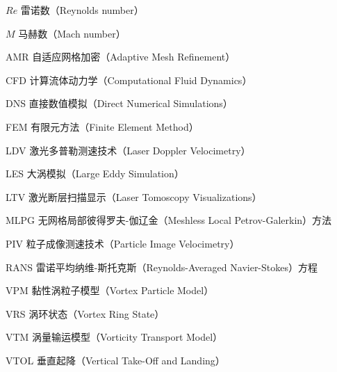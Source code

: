 \begin{denotation}
\item[$Re$] 雷诺数（Reynolds number）
\item[$M$] 马赫数（Mach number）
\item[AMR] 自适应网格加密（Adaptive Mesh Refinement）
\item[CFD] 计算流体动力学（Computational Fluid Dynamics）
\item[DNS] 直接数值模拟（Direct Numerical Simulations）
\item[FEM] 有限元方法（Finite Element Method）
\item[LDV] 激光多普勒测速技术（Laser Doppler Velocimetry）
\item[LES] 大涡模拟（Large Eddy Simulation）
\item[LTV] 激光断层扫描显示（Laser Tomoscopy Visualizations）
\item[MLPG] 无网格局部彼得罗夫-伽辽金（Meshless Local Petrov-Galerkin）方法
\item[PIV] 粒子成像测速技术（Particle Image Velocimetry）
\item[RANS] 雷诺平均纳维-斯托克斯（Reynolds-Averaged Navier-Stokes）方程
\item[VPM] 黏性涡粒子模型（Vortex Particle Model）
\item[VRS] 涡环状态（Vortex Ring State）
\item[VTM] 涡量输运模型（Vorticity Transport Model）
\item[VTOL] 垂直起降（Vertical Take-Off and Landing）
\end{denotation}
